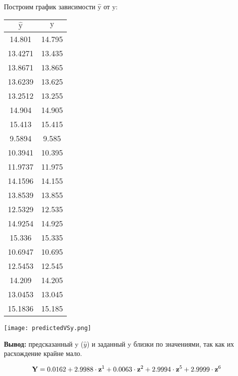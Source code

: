 Построим график зависимости $\hat{\textrm{y}}$ от $\textrm{y}$:

\renewcommand{\arraystretch}{0.65}
\begin{center}
    \begin{tabular}{ | c | c | } 
    \hline
    $\hat{\textrm{y}}$ & $\textrm{y}$ \\
    \hline
    14.801 & 14.795 \\
    \hline
   13.4271 & 13.435 \\
    \hline
   13.8671 & 13.865 \\
    \hline
   13.6239 & 13.625 \\
    \hline
   13.2512 & 13.255 \\
    \hline
   14.904 & 14.905 \\
    \hline
   15.413 & 15.415 \\
    \hline
   9.5894 & 9.585 \\
    \hline
   10.3941 & 10.395 \\
    \hline
   11.9737 & 11.975 \\
    \hline
   14.1596 & 14.155 \\
    \hline
   13.8539 & 13.855 \\
    \hline
   12.5329 & 12.535 \\
    \hline
   14.9254 & 14.925 \\
    \hline
   15.336 & 15.335 \\
    \hline
   10.6947 & 10.695 \\
    \hline
   12.5453 & 12.545 \\
    \hline
   14.209 & 14.205 \\
    \hline
   13.0453 & 13.045 \\
    \hline
   15.1836 & 15.185 \\
    \hline 
    \end{tabular}
\end{center}

\begin{center}
    \texttt{[image: predictedVSy.png]}
\end{center}

\textbf{Вывод:} предсказанный y ($\hat{y}$) и заданный y близки по значениями, так как их расхождение крайне мало.

\begin{equation*}
    \textrm{\textbf{Y}} = 0.0162 + 2.9988 \cdot \textrm{\textbf{z}}^1 + 0.0063 \cdot \textrm{\textbf{z}}^2 + 2.9994 \cdot \textrm{\textbf{z}}^5 + 2.9999 \cdot \textrm{\textbf{z}}^6
\end{equation*}

